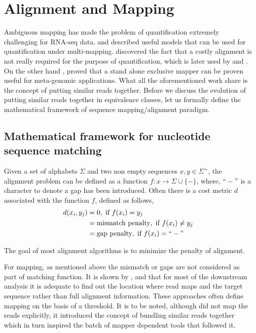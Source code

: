 \section{Alignment and Mapping}
Ambiguous mapping has made the problem of quantification extremely challenging for RNA-seq data. \citet{salzman2011statistical} and \citet{pachter2011models} described useful models that can be used for quantification under multi-mapping. \citet{sailfish} discovered the fact that a costly alignment is not really required for the purpose of quantification, which is later used by \citet{kallisto} and \citet{salmon}. On the other hand \citet{rapmap},  proved that a stand alone exclusive mapper can be proven useful for meta-genomic applications. What all the aforementioned work share is the concept of putting similar reads together. Before we discuss the evolution of putting similar reads together in equivalence classes, let us formally define the mathematical framework of sequence mapping/alignment paradigm. 

\subsection{Mathematical framework for nucleotide sequence matching}
Given a set of alphabets $\Sigma$ and two non empty sequences $x,y \in \Sigma^+$, the alignment problem can be defined as a function $f : x \rightarrow \Sigma \cup \{-\}$, where, $``-"$ is a character to denote a gap has been introduced. Often there is a cost metric $d$ associated with the function $f$, defined as follows, 
\begin{align}
    d(x_i,y_j) &= 0,\text{ if } f(x_i) = y_j \\
    &= \text{mismatch penalty},\text{ if } f(x_i) \neq y_j \\
    &= \text{gap penalty},\text{ if } f(x_i) = ``-" 
\end{align}

The goal of most alignment algorithms \citep{Li2010} is to minimize the penalty of alignment. 

For mapping, as mentioned above the mismatch or gaps are not considered as part of matching function. It is shown by \citet{salmon},\citet{kallisto} and \citet{rapmap} that for most of the downstream analysis it is adequate to find out the location where read maps and the target sequence rather than full alignment information. These approaches often define mapping on the basis of a threshold. It is to be noted, although \citet{sailfish} did not map the reads explicitly, it introduced the concept of bundling similar reads together which in turn inspired the batch of mapper dependent tools that followed it.

